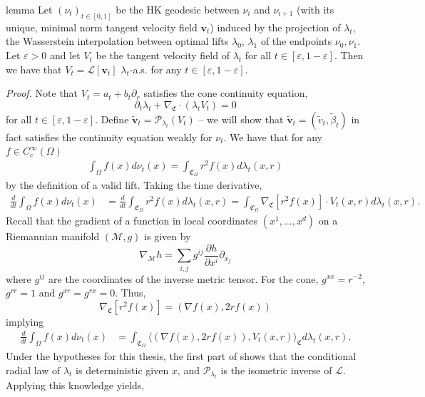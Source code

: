 \documentclass[11pt]{article}
\newcommand{\man}{\mathcal{M}}
\begin{document}
\begin{restatable}{lemma}{} \label{v i i+1}
    Let $(\nu_t)_{t \in [0,1]}$ be the HK geodesic between $\nu_i$ and $\nu_{i+1}$ (with its unique, minimal norm tangent velocity field $\mathbf{v}_t$) induced by the projection of $\lambda_t$, the Wasserstein interpolation between optimal lifts $\lambda_0$, $\lambda_1$ of the endpoints $\nu_0, \nu_1$. Let $\varepsilon>0$ and let $V_t$ be the tangent velocity field of $\lambda_t$ for all $t \in [\varepsilon, 1- \varepsilon]$. Then we have that $V_t = \mathcal{L}[\mathbf{v}_t]$ $
    \lambda_t$-a.s. for any $t \in [\varepsilon, 1- \varepsilon]$.
\end{restatable}
\noindent \textit{Proof.} Note that $V_t = a_t + b_t\partial_r$ satisfies the cone continuity equation,
\[\partial_t\lambda_t + \nabla_{\mathfrak{C}}\cdot(\lambda_tV_t) = 0\]
for all $t \in [\varepsilon, 1 - \varepsilon]$. Define $\tilde{\mathbf{v}}_t = \mathcal{P}_{\lambda_t}(V_t)$ -- we will show that $\tilde{\mathbf{v}}_t = (\tilde v_t, \tilde \beta_t)$ in fact satisfies the continuity equation weakly for $\nu_t$. We have that for any $f \in C^\infty_c(\Omega)$
\begin{align*}
    \int_\Omega f(x) d\nu_t(x) = \int_{\mathfrak{C}_\Omega} r^2f(x) d\lambda_t(x,r)
\end{align*}
by the definition of a valid lift. Taking the time derivative,
\begin{align*}
    \frac{d}{dt}\int_\Omega f(x) d\nu_t(x) &= \frac{d}{dt} \int_{\mathfrak{C}_{\Omega}} r^2 f(x) d\lambda_t(x,r) = \int_{\mathfrak{C}_\Omega} \nabla_{\mathfrak{C}}[r^2f(x)] \cdot V_t(x,r) d\lambda_t(x,r).
\end{align*}
Recall that the gradient of a function in local coordinates $(x^1, \dots, x^d)$ on a Riemannian manifold $(\man, g)$ is given by
\[\nabla_{\man} h = \sum_{i,j}g^{ij} \frac{\partial h}{\partial x^i}\partial_{x_j}\]
where $g^{ij}$ are the coordinates of the inverse metric tensor. For the cone, $g^{xx} = r^{-2}$, $g^{rr} = 1$ and $g^{xr} = g^{rx} = 0$.  Thus, 
\[\nabla_{\mathfrak{C}}[r^2f(x)] = (\nabla f(x), 2rf(x))\]
implying
\begin{align*}
    \frac{d}{dt}\int_\Omega f(x) d\nu_t(x) &= \int_{\mathfrak{C}_\Omega} \Big\langle (\nabla f(x), 2rf(x)),  V_t(x,r)\Big\rangle_\mathfrak{C} d\lambda_t(x,r).
\end{align*}
Under the hypotheses for this thesis, the first part of  shows that the conditional radial law of $\lambda_t$ is deterministic given $x$, and $\mathcal{P}_{\lambda_t}$ is the isometric inverse of $\mathcal{L}.$ Applying this knowledge yields,
\end{document}
